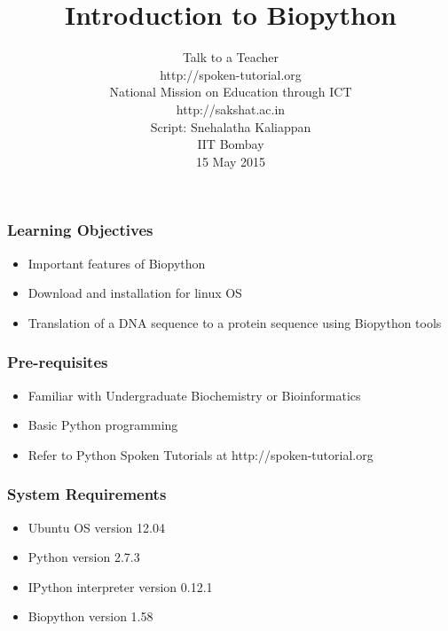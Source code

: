 \documentclass[17pt]{beamer}
\begin{document}
\sffamily \bfseries
 \title
[Introduction to Biopython\hspace{0.75cm}]
{Introduction to Biopython}
\author
[Snehalatha]
{\small Talk to a Teacher \\ http://spoken-tutorial.org\\ National Mission on Education
  through ICT \\ http://sakshat.ac.in \\ [0.2cm]
 Script: Snehalatha Kaliappan\\IIT Bombay \\ [0.2cm]
{\small 15 May 2015} \\[0.2cm]
}
\begin{frame}
\titlepage
\end{frame}

\begin{frame}
\frametitle{Learning Objectives} \pause
\begin{itemize}[<+-|alert@+>]
\item Important features of Biopython
\item Download and installation for linux OS
\item Translation of a DNA sequence to a protein sequence using Biopython tools
\end{itemize}
\end{frame}

\begin{frame}
\frametitle{Pre-requisites} \pause
\begin{itemize}[<+-|alert@+>]
\item Familiar with Undergraduate Biochemistry or Bioinformatics
\item Basic Python programming
\item Refer to Python Spoken Tutorials at {\color{blue}http://spoken-tutorial.org} 
\end{itemize}
\end{frame}

\begin{frame}
\frametitle{System Requirements} \pause
\begin{itemize}[<+-|alert@+>]
\item Ubuntu OS version 12.04
\item Python version 2.7.3
\item IPython interpreter version 0.12.1
\item Biopython version 1.58
\end{itemize}
\end{frame}
\end{document}

